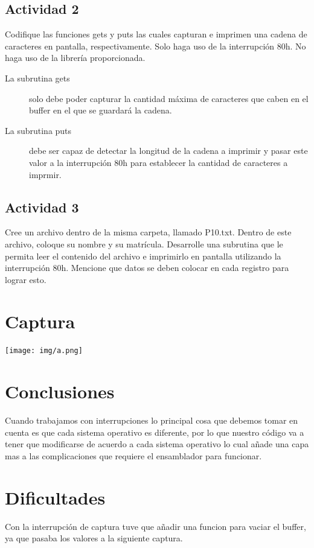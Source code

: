 \documentclass[12pt]{article}
\begin{document}
\subsection*{Actividad 2}
\label{sec:orgf153df1}
Codifique las funciones gets y puts las cuales capturan e imprimen una 
cadena de caracteres en pantalla, respectivamente. Solo haga uso de la 
interrupción 80h. No haga uso de la librería proporcionada.

\begin{description}
\item[{La subrutina gets}] solo debe poder capturar la cantidad máxima de caracteres que caben en el buffer en el que se guardará la cadena.

\item[{La subrutina puts}] debe ser capaz de detectar la longitud de la cadena a imprimir y pasar este valor a la interrupción 80h para establecer la cantidad de  caracteres a imprmir.
\end{description}

\subsection*{Actividad 3}
\label{sec:org42bb9d7}
Cree un archivo dentro de la misma carpeta, llamado P10.txt. Dentro de
este archivo, coloque su nombre y su matrícula. Desarrolle una subrutina
que le permita leer el contenido del archivo e imprimirlo en pantalla
utilizando la interrupción 80h. Mencione que datos se deben colocar en
cada registro para lograr esto. 

\section*{Captura}
\label{sec:orgd612cb4}
\begin{center}
\texttt{[image: img/a.png]}
\end{center}

\section*{Conclusiones}
\label{sec:org0691a3a}
Cuando trabajamos con interrupciones lo principal cosa que debemos tomar en cuenta
es que cada sistema operativo es diferente, por lo que nuestro código va a tener
que modificarse de acuerdo a cada sistema operativo lo cual añade una capa mas
a las complicaciones que requiere el ensamblador para funcionar.

\section*{Dificultades}
\label{sec:org7bad91b}
Con la interrupción de captura tuve que añadir una funcion para vaciar el 
buffer, ya que pasaba los valores a la siguiente captura.
\end{document}

